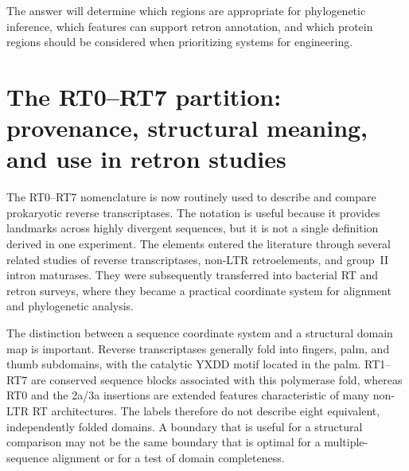 The answer will determine which regions are appropriate for phylogenetic
inference, which features can support retron annotation, and which protein
regions should be considered when prioritizing systems for engineering.







\section{The RT0--RT7 partition: provenance, structural meaning, and use in retron studies}
\label{sec:rt-partition-integrated}

The RT0--RT7 nomenclature is now routinely used to describe and compare
prokaryotic reverse transcriptases. The notation is useful because it provides
landmarks across highly divergent sequences, but it is not a single definition
derived in one experiment. The elements entered the literature through several
related studies of reverse transcriptases, non-LTR retroelements, and group~II
intron maturases. They were subsequently transferred into bacterial RT and
retron surveys, where they became a practical coordinate system for alignment
and phylogenetic analysis.

The distinction between a sequence coordinate system and a structural domain
map is important. Reverse transcriptases generally fold into fingers, palm, and
thumb subdomains, with the catalytic YXDD motif located in the palm. RT1--RT7
are conserved sequence blocks associated with this polymerase fold, whereas
RT0 and the 2a/3a insertions are extended features characteristic of many
non-LTR RT architectures. The labels therefore do not describe eight
equivalent, independently folded domains. A boundary that is useful for a
structural comparison may not be the same boundary that is optimal for a
multiple-sequence alignment or for a test of domain completeness.

